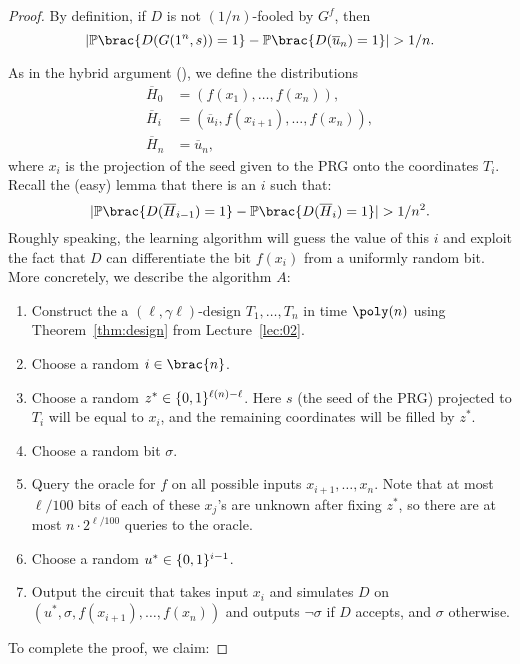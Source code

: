 \begin{proof}
  By definition, if $D$ is not $(1/n)$-fooled by $G^f$, then
  \[
    \card{\Pr\brac{D(G(1^n, s)) = 1} - \Pr\brac{D(\overline{u}_n) = 1}} > 1/n.
  \]

  As in the hybrid argument (), we define the
  distributions
  \begin{align*}
    \overline{H}_0 &= (f(x_1), \ldots, f(x_n)),\\
    \overline{H}_i &= (\overline{u}_i, f(x_{i + 1}), \ldots, f(x_n)),\\
    \overline{H}_n &= \overline{u}_n,
  \end{align*}
  where $x_i$ is the projection of the seed given to the PRG onto the
  coordinates $T_i$. Recall the (easy) lemma that there is an $i$ such that:
  \[
    \card{\Pr\brac{D(\overline{H}_{i - 1}) = 1} - \Pr\brac{D(\overline{H}_i) = 1}} > 1 / n^2.
  \]
  Roughly speaking, the learning algorithm will guess the value of this $i$ and
  exploit the fact that $D$ can differentiate the bit $f(x_i)$ from a uniformly
  random bit. More concretely, we describe the algorithm $A$:
  \begin{enumerate}
    \item Construct the a $(\ell, \gamma \ell)$-design $T_1, \dots, T_n$ in
      time $\poly(n)$ using Theorem~\ref{thm:design} from
      Lecture~\ref{lec:02}.
    \item Choose a random $i \in \brac{n}$.
    \item Choose a random $z^* \in \{0, 1\}^{\ell(n) - \ell}$. Here $s$
      (the seed of the PRG) projected to $T_i$ will be equal to $x_i$,
      and the remaining coordinates will be filled by $z^*$.
    \item Choose a random bit $\sigma$.
    \item Query the oracle for $f$ on all possible inputs
      $x_{i + 1}, \ldots , x_n$. Note that at most $\ell / 100$ bits of
      each of these $x_j$'s are unknown after fixing $z^*$, so there
      are at most $n \cdot 2^{\ell / 100}$ queries to the oracle.
    \item Choose a random $u^* \in \{0, 1\}^{i - 1}$.
    \item Output the circuit that takes input $x_i$ and simulates
      $D$ on $(u^*, \sigma, f(x_{i + 1}), \ldots , f(x_n))$ and outputs
      $\lnot \sigma$ if $D$ accepts, and $\sigma$ otherwise.
  \end{enumerate}
  To complete the proof, we claim:


\end{proof}
